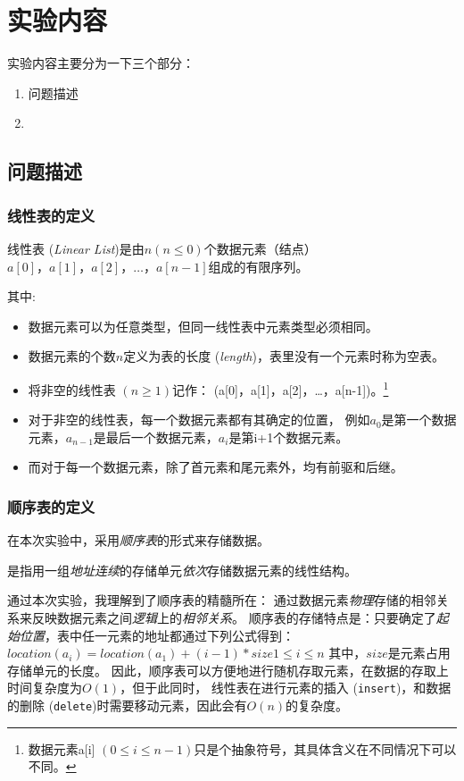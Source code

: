 \documentclass[format=draft,language=chinese,category=academic-report]{hustreport}
\begin{document}

\section{实验内容}\label{sec:2}
    实验内容主要分为一下三个部分：
\begin{enumerate}
    \item 问题描述
    \item 
\end{enumerate}
\subsection{问题描述}
\subsubsection{线性表的定义}
\begin{definition}\label{def:linear list}
    线性表 (\emph{Linear List})是由$n (n \le 0)$个数据元素（结点）$a[0]，a[1]，a[2]，\dots ，a[n-1]$组成的有限序列。
\end{definition}
其中:
\begin{itemize}
    \item 数据元素可以为任意类型，但同一线性表中元素类型必须相同。
    \item 数据元素的个数$n$定义为表的长度 (\emph{length})，表里没有一个元素时称为空表。
    \item 将非空的线性表 $(n \ge 1)$记作： (a[0]，a[1]，a[2]，\dots ，a[n-1])。\footnote{数据元素a[i] $(0\le i \le n-1)$只是个抽象符号，其具体含义在不同情况下可以不同。}
    \item 对于非空的线性表，每一个数据元素都有其确定的位置，
        例如$a_{0}$是第一个数据元素，$a_{n-1}$是最后一个数据元素，$a_i$是第i+1个数据元素。
    \item 而对于每一个数据元素，除了首元素和尾元素外，均有前驱和后继。
\end{itemize}
\subsubsection{顺序表的定义}
在本次实验中，采用\emph{顺序表}的形式来存储数据。
\begin{definition}\label{def:list}
    是指用一组\emph{地址连续}的存储单元\emph{依次}存储数据元素的线性结构。
\end{definition}
通过本次实验，我理解到了顺序表的精髓所在：
通过数据元素\emph{物理}存储的相邻关系来反映数据元素之间\emph{逻辑}上的\emph{相邻关系}。
\newline
顺序表的存储特点是：只要确定了\emph{起始位置}，表中任一元素的地址都通过下列公式得到：
$location(a_i) = location(a_1) + (i-1) * size 　1\le i\le n$ 其中，$size$是元素占用存储单元的长度。
因此，顺序表可以方便地进行随机存取元素，在数据的存取上时间复杂度为$O(1)$，但于此同时，
线性表在进行元素的插入 (\texttt{insert})，和数据的删除 (\texttt{delete})时需要移动元素，因此会有$O(n)$的复杂度。
\end{document}
